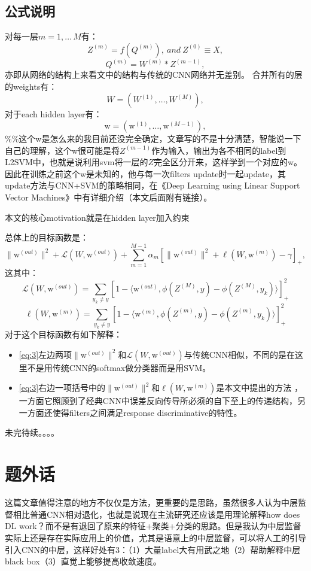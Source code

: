 \documentclass{article}
\begin{document}
\begin{CJK}{UTF8}{gbsn}
\subsection{公式说明}
对每一层$m=1,\dots\,M$有：
\begin{equation} Z^{(m)}=f(Q^{(m)}),~and~Z^{(0)}\equiv X, \end{equation}
\begin{equation} Q^{(m)}=W^{(m)}\ast Z^{(m-1)}, \end{equation}
亦即从网络的结构上来看文中的结构与传统的CNN网络并无差别。
合并所有的层的weights有：
$$W=(W^{(1)},\dots,W^{(M)}),$$
对于each hidden layer有：
$$\mathrm{w}=(\mathrm{w}^{(1)},\dots,\mathrm{w}^{(M-1)}),$$
{\color{red}\%\%}这个w是怎么来的我目前还没完全确定，文章写的不是十分清楚，智能说一下自己的理解，这个w很可能是将$Z^{(m-1)}$作为输入，输出为各不相同的label到L2SVM中，也就是说利用svm将一层的$Z$完全区分开来，这样学到一个对应的w。因此在训练之前这个w是未知的，他与每一次filters update时一起update，其update方法与CNN+SVM的策略相同，在《Deep Learning using Linear Support Vector Machines》中有详细介绍（本文后面附有链接）。

{\color{red}本文的核心motivation就是在hidden layer加入约束}


总体上的目标函数是：
\begin{equation}\label{eq:3}
 \|\mathrm{w}^{(out)}\|^2+\mathcal{L}(W,\mathrm{w}^{(out)})+\sum^{M-1}_{m=1}\alpha_m\left[\|\mathrm{w}^{(out)}\|^2+\ell(W,\mathrm{w}^{(m)})-\gamma\right]_+, \end{equation}
这其中：
\begin{equation}
\mathcal{L}(W,\mathrm{w}^{(out)})=\sum_{y_k\neq y}\left[1-\langle\mathrm{w}^{(out)},\phi(Z^{(M)},y)-\phi(Z^{(M)},y_k)\rangle\right]^2_+
\end{equation}
\begin{equation} 
\ell(W,\mathrm{w}^{(m)})=\sum_{y_k\neq y}\left[1-\langle\mathrm{w}^{(m)},\phi(Z^{(m)},y)-\phi(Z^{(m)},y_k)\rangle\right]^2_+
\end{equation}
对于这个目标函数有如下解释：
\begin{itemize}
\item\eqref{eq:3}左边两项$\|\mathrm{w}^{(out)}\|^2$和$\mathcal{L}(W,\mathrm{w}^{(out)})$与传统CNN相似，不同的是在这里不是用传统CNN的softmax做分类器而是用SVM。
\item\eqref{eq:3}右边一项括号中的$\|\mathrm{w}^{(out)}\|^2$和$\ell(W,\mathrm{w}^{(m)})$是本文中提出的方法
，一方面它照顾到了经典CNN中误差反向传导所必须的自下至上的传递结构，另一方面还使得filters之间满足response discriminative的特性。
\end{itemize}
未完待续。。。。

\section{题外话}
这篇文章值得注意的地方不仅仅是方法，更重要的是思路，虽然很多人认为中层监督相比普通CNN相对退化，也就是说现在主流研究还应该是用理论解释how does DL work？而不是有退回了原来的特征+聚类+分类的思路。但是我认为中层监督实际上还是存在实际应用上的价值，尤其是语意上的中层监督，可以将人工的引导引入CNN的中层，这样好处有3：（1）大量label大有用武之地（2）帮助解释中层black box（3）直觉上能够提高收敛速度。





\end{CJK}
\end{document}
